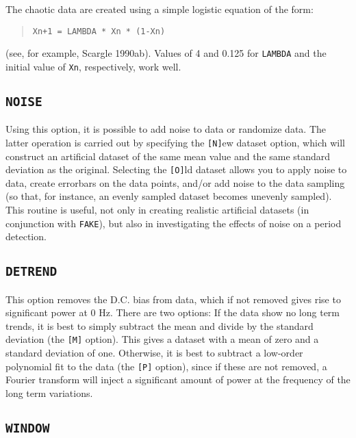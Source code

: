 The chaotic data are created using a simple logistic equation of the form:

\begin{quote}
{\tt Xn+1 = LAMBDA * Xn * (1-Xn)} 
\end{quote}

(see, for example, Scargle 1990ab). Values of 4 and 0.125 for {\tt LAMBDA} 
and the initial value of {\tt Xn}, respectively, work well. 

\subsection*{\tt NOISE}

Using this option, it is possible to add noise to data or randomize data. The
latter operation is carried out by specifying the {\tt [N]}ew dataset option,
which will construct an artificial dataset of the same mean value and the same
standard deviation as the original. Selecting the {\tt [O]}ld dataset allows
you to apply noise to data, create errorbars on the data points, and/or add
noise to the data sampling (so that, for instance, an evenly sampled dataset
becomes unevenly sampled). This routine is useful, not only in creating
realistic artificial datasets (in conjunction with {\tt FAKE}), but also in
investigating the effects of noise on a period detection. 

\subsection*{\tt DETREND}

This option removes the D.C. bias from data, which if not removed gives rise to
significant power at 0 Hz. There are two options: If the data show no long term
trends, it is best to simply subtract the mean and divide by the standard
deviation (the {\tt [M]} option). This gives a dataset with a mean of zero and
a standard deviation of one. Otherwise, it is best to subtract a low-order
polynomial fit to the data (the {\tt [P]} option), since if these are not
removed, a Fourier transform will inject a significant amount of power at the
frequency of the long term variations. 

\subsection*{\tt WINDOW}

